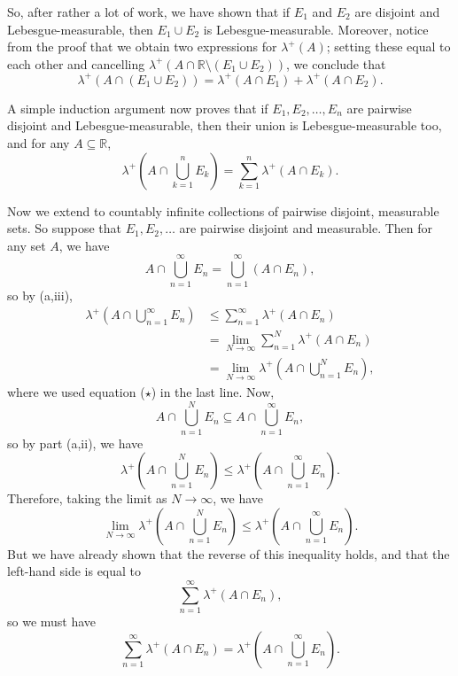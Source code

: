 \documentclass{article}
\let\take\setminus
\begin{document}
\begin{enumerate}
\begin{enumerate}
\begin{enumerate}
{							\bigskip
							
							So, after rather a lot of work, we have shown that if $E_1$ and $E_2$ are disjoint and Lebesgue-measurable, then $E_1\cup E_2$ is Lebesgue-measurable. Moreover, notice from the proof that we obtain two expressions for $\lambda^+(A)$; setting these equal to each other and cancelling $\lambda^+(A\cap\mathbb{R}\take(E_1\cup E_2))$, we conclude that
							\[\lambda^+(A\cap(E_1\cup E_2))=\lambda^+(A\cap E_1)+\lambda^+(A\cap E_2).\]
							
							A simple induction argument now proves that if $E_1,E_2,\hdots,E_n$ are pairwise disjoint and Lebesgue-measurable, then their union is Lebesgue-measurable too, and for any $A\subseteq \mathbb{R}$,
							\begin{equation*}
								\lambda^+\left(A\cap\bigcup_{k=1}^n E_k\right)=\sum_{k=1}^n \lambda^+(A\cap E_k).\tag{$\star$}
							\end{equation*}
							
							Now we extend to countably infinite collections of pairwise disjoint, measurable sets. So suppose that $E_1,E_2,\hdots$ are pairwise disjoint and measurable. Then for any set $A$, we have
							\[A\cap\bigcup_{n=1}^\infty E_n=\bigcup_{n=1}^\infty (A\cap E_n),\]
							so by (a,iii),
							\begin{align*}
								\lambda^+\left(A\cap\bigcup_{n=1}^\infty E_n\right)&\leq \sum_{n=1}^\infty \lambda^+ (A\cap E_n)\\
								&=\lim_{N\to\infty}\sum_{n=1}^N \lambda^+(A\cap E_n)\\
								&=\lim_{N\to \infty}\lambda^+\left(A\cap\bigcup_{n=1}^N E_n\right),
							\end{align*}
							where we used equation ($\star$) in the last line. Now,
							\[A\cap\bigcup_{n=1}^N E_n\subseteq A\cap \bigcup_{n=1}^\infty E_n,\]
							so by part (a,ii), we have
							\[\lambda^+\left(A\cap\bigcup_{n=1}^N E_n\right)\leq \lambda^+\left(A\cap\bigcup_{n=1}^\infty E_n\right).\]
							Therefore, taking the limit as $N\to \infty$, we have
							\[\lim_{N\to \infty}\lambda^+\left(A\cap\bigcup_{n=1}^N E_n\right)\leq \lambda^+\left(A\cap\bigcup_{n=1}^\infty E_n\right).\]
							But we have already shown that the reverse of this inequality holds, and that the left-hand side is equal to
							\[\sum_{n=1}^\infty \lambda^+(A\cap E_n),\]
							so we must have
							\begin{equation*}
								\sum_{n=1}^\infty \lambda^+(A\cap E_n)= \lambda^+\left(A\cap\bigcup_{n=1}^\infty E_n\right).\tag{$\star\star$}
							\end{equation*}
							
}
\end{enumerate}
\end{enumerate}
\end{enumerate}
\end{document}
